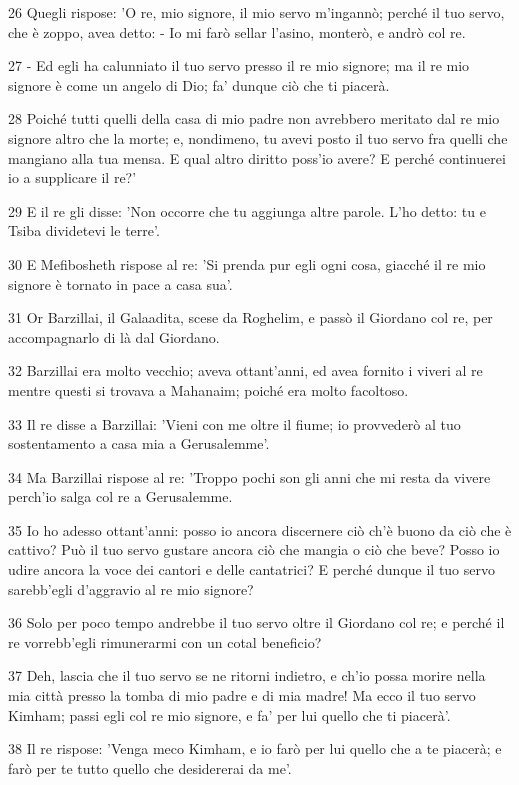 \par 26 Quegli rispose: 'O re, mio signore, il mio servo m'ingannò; perché il tuo servo, che è zoppo, avea detto: - Io mi farò sellar l'asino, monterò, e andrò col re.
\par 27 - Ed egli ha calunniato il tuo servo presso il re mio signore; ma il re mio signore è come un angelo di Dio; fa' dunque ciò che ti piacerà.
\par 28 Poiché tutti quelli della casa di mio padre non avrebbero meritato dal re mio signore altro che la morte; e, nondimeno, tu avevi posto il tuo servo fra quelli che mangiano alla tua mensa. E qual altro diritto poss'io avere? E perché continuerei io a supplicare il re?'
\par 29 E il re gli disse: 'Non occorre che tu aggiunga altre parole. L'ho detto: tu e Tsiba dividetevi le terre'.
\par 30 E Mefibosheth rispose al re: 'Si prenda pur egli ogni cosa, giacché il re mio signore è tornato in pace a casa sua'.
\par 31 Or Barzillai, il Galaadita, scese da Roghelim, e passò il Giordano col re, per accompagnarlo di là dal Giordano.
\par 32 Barzillai era molto vecchio; aveva ottant'anni, ed avea fornito i viveri al re mentre questi si trovava a Mahanaim; poiché era molto facoltoso.
\par 33 Il re disse a Barzillai: 'Vieni con me oltre il fiume; io provvederò al tuo sostentamento a casa mia a Gerusalemme'.
\par 34 Ma Barzillai rispose al re: 'Troppo pochi son gli anni che mi resta da vivere perch'io salga col re a Gerusalemme.
\par 35 Io ho adesso ottant'anni: posso io ancora discernere ciò ch'è buono da ciò che è cattivo? Può il tuo servo gustare ancora ciò che mangia o ciò che beve? Posso io udire ancora la voce dei cantori e delle cantatrici? E perché dunque il tuo servo sarebb'egli d'aggravio al re mio signore?
\par 36 Solo per poco tempo andrebbe il tuo servo oltre il Giordano col re; e perché il re vorrebb'egli rimunerarmi con un cotal beneficio?
\par 37 Deh, lascia che il tuo servo se ne ritorni indietro, e ch'io possa morire nella mia città presso la tomba di mio padre e di mia madre! Ma ecco il tuo servo Kimham; passi egli col re mio signore, e fa' per lui quello che ti piacerà'.
\par 38 Il re rispose: 'Venga meco Kimham, e io farò per lui quello che a te piacerà; e farò per te tutto quello che desidererai da me'.
